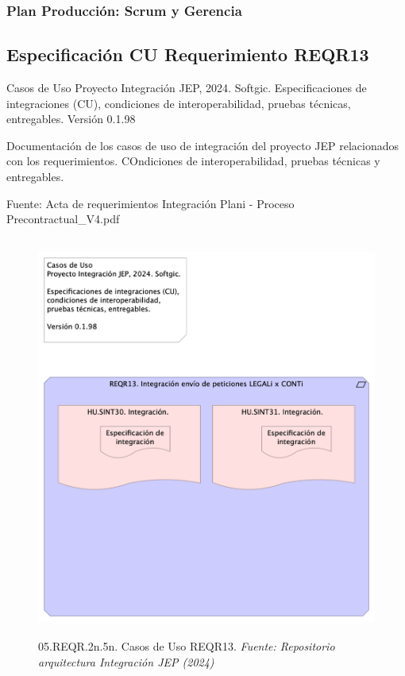 \documentclass[
  paper=a4,
  ,captions=tableheading
]{scrartcl}
\renewenvironment{quote}{\begin{customblockquote}\list{}{\rightmargin=0em\leftmargin=0em}%
\item\relax\color{blockquote-text}\ignorespaces}{\unskip\unskip\endlist\end{customblockquote}}
\begin{document}
\subsubsection{Plan Producción: Scrum y
Gerencia}\label{sec:plan-producciuxf3n-scrum-y-gerencia-1}

\subsection{Especificación CU Requerimiento
REQR13}\label{sec:especificaciuxf3n-cu-requerimiento-reqr13}

\begin{quote}
Casos de Uso Proyecto Integración JEP, 2024. Softgic. Especificaciones
de integraciones (CU), condiciones de interoperabilidad, pruebas
técnicas, entregables. Versión 0.1.98
\end{quote}

Documentación de los casos de uso de integración del proyecto JEP
relacionados con los requerimientos. COndiciones de interoperabilidad,
pruebas técnicas y entregables.

Fuente: Acta de requerimientos Integración Plani - Proceso
Precontractual\_V4.pdf

\begin{figure}
\centering
\includegraphics[width=\textwidth,height=5.20833in]{images/05.REQR.2n.5n.CasosdeUsoREQR13.png}
\caption{05.REQR.2n.5n. Casos de Uso REQR13. \emph{Fuente: Repositorio
arquitectura Integración JEP
(2024)}}\label{fig:id-d6e0a0d4192e4eb6955c7363e93a0bf5}
\end{figure}
\end{document}
